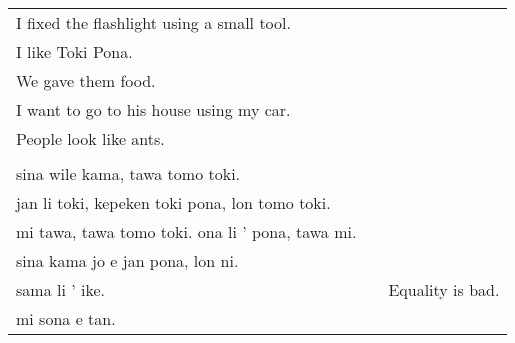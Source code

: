 \begin{supertabular}{p{5,5cm}|ll}
I fixed the flashlight using a small tool.  &&  \\  %
I like Toki Pona.  &&  \\  %
We gave them food.  &&  \\ %
I want to go to his house using my car.  &&  \\  %
People look like ants. && \\ %
&& \\ %
sina wile kama, tawa tomo toki.  &&  \\ %
jan li toki, kepeken toki pona, lon tomo toki.  &&  \\ %
mi tawa, tawa tomo toki. ona li ' pona, tawa mi.  &&  \\ %
sina kama jo e jan pona, lon ni.  &&  \\ %
sama li ' ike. && Equality is bad. \\ %
mi sona e tan. &&  \\ %
\end{supertabular} 

%

